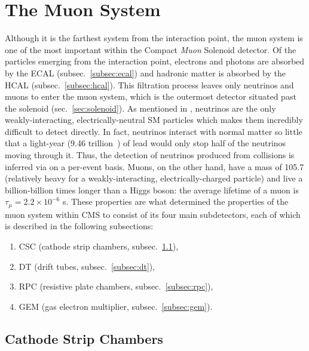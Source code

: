 \section{The Muon System}
\label{sec:muon_sys}

Although it is the farthest system from the interaction point, the muon system is one of the most important within the Compact \emph{Muon} Solenoid detector.
Of the particles emerging from the interaction point, electrons and photons are absorbed by the ECAL (subsec.~\ref{subsec:ecal}) and hadronic matter is absorbed by the HCAL (subsec.~\ref{subsec:hcal}).
This filtration process leaves only neutrinos and muons to enter the muon system, which is the outermost detector situated past the solenoid (sec.~\ref{sec:solenoid}).
As mentioned in
, neutrinos are the only weakly-interacting, electrically-neutral SM particles which makes them incredibly difficult to detect directly.
In fact, neutrinos interact with normal matter so little that a light-year (9.46 trillion~\km) of lead would only stop half of the neutrinos moving through it.
Thus, the detection of neutrinos produced from \pp collisions is inferred via \MET on a per-event basis.
Muons, on the other hand, have a mass of 105.7 \MeV (relatively heavy for a weakly-interacting, electrically-charged particle) and live a billion-billion times longer than a Higgs boson: the average lifetime of a muon is $\tau_{\mu} = 2.2 \times 10^{-6}$ s.
These properties are what determined the properties of the muon system within CMS to consist of its four main subdetectors, each of which is described in the following subsections:
\begin{enumerate}
    \item CSC (cathode strip chambers, subsec.~\ref{subsec:csc}),
    \item DT (drift tubes, subsec.~\ref{subsec:dt}),
    \item RPC (resistive plate chambers, subsec.~\ref{subsec:rpc}),
    \item GEM (gas electron multiplier, subsec.~\ref{subsec:gem}).
\end{enumerate}

\subsection{Cathode Strip Chambers}
\label{subsec:csc}

